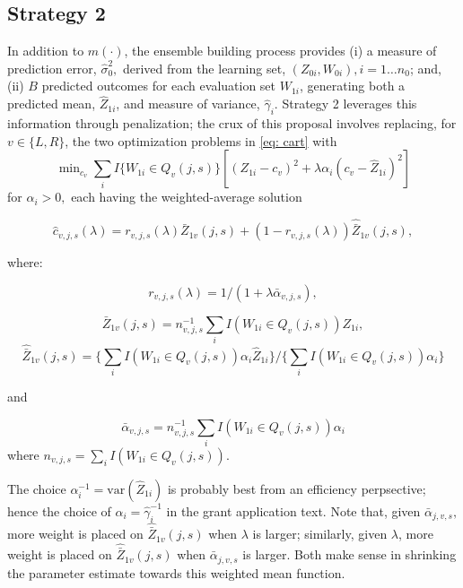 \documentclass[12pt]{article}
\begin{document}
\subsection{Strategy 2} In addition to $\widehat{m}(\cdot)$, the
ensemble building process provides
(i) a measure of prediction error,
$\hat{\sigma}^2_0,$ derived from the learning set, $(Z_{0i}, W_{0i}), i = 1 \ldots n_0$;
and, (ii) $B$ predicted outcomes for each evaluation set $W_{1i}$, generating
both a predicted mean, $\widehat{Z}_{1i}$, and measure of
variance, $\hat{\gamma}_{i}.$ Strategy 2 leverages this
information through penalization;
the crux of this proposal involves replacing,
for $v \in \{L,R\}$, the two optimization problems in
\eqref{eq: cart} with
\begin{equation}
  \label{bigopt}
  \min\nolimits_{c_v} {\textstyle \sum\nolimits}_i I\{W_{1i} \in
  Q_{v}(j,s)\} \left[ (Z_{1i}-c_v)^2 + \lambda \alpha_i
    (c_v-\widehat{Z}_{1i})^2 \right]
\end{equation}
for $\alpha_i > 0,$ each having the weighted-average solution 

\begin{equation}
	\label{chat}
	\widehat{c}_{v,j,s}(\lambda) =
	r_{v,j,s}(\lambda) \bar{Z}_{1v}(j,s) + (1-r_{v,j,s}(\lambda)) \hat{\bar{Z}}_{1v}(j,s),
\end{equation}

where:

\begin{equation}
	r_{v,j,s}(\lambda) = 1/(1 + \lambda \bar{\alpha}_{v,j,s}),
\end{equation}

\begin{equation}
	{\bar{Z}}_{1v}(j,s) = n^{-1}_{v,j,s} 
	 {\textstyle \sum\nolimits}_iI(W_{1i} \in Q_{v}(j,s)) {Z}_{1i} ,
\end{equation} 
\begin{equation}
	\label{mean_pred_Zis}
	\hat{\bar{Z}}_{1v}(j,s) =
	\{ {\textstyle \sum\nolimits}_iI(W_{1i} \in Q_{v}(j,s)) \alpha_i  \hat{Z}_{1i} \}
	/ \{ {\textstyle \sum\nolimits}_i I(W_{1i} \in Q_{v}(j,s)) \alpha_i \}
\end{equation}

and

\begin{equation}
	\bar{\alpha}_{v,j,s} = n^{-1}_{v,j,s} \sum_i I(W_{1i} \in Q_{v}(j,s))
\alpha_i
\end{equation}
where $n_{v,j,s} =  \sum_i I( W_{1i} \in Q_{v}(j,s) ).$


The choice $\alpha^{-1}_i = \mbox{var}( \hat{Z}_{1i} )$ is probably
best from an efficiency perpsective; hence the choice of
$\alpha_i = \hat{\gamma}^{-1}_{i}$ in the grant application text. Note that, given $\bar{\alpha}_{j,v,s},$  more weight is placed on
$\hat{\bar{Z}}_{1v}(j,s)$ when $\lambda$ is larger; similarly, 
given $\lambda$, more weight is placed on
$\hat{\bar{Z}}_{1v}(j,s)$ when $\bar{\alpha}_{j,v,s}$ is larger.
Both make sense in shrinking the parameter estimate
towards this weighted mean function.\\
\end{document}
